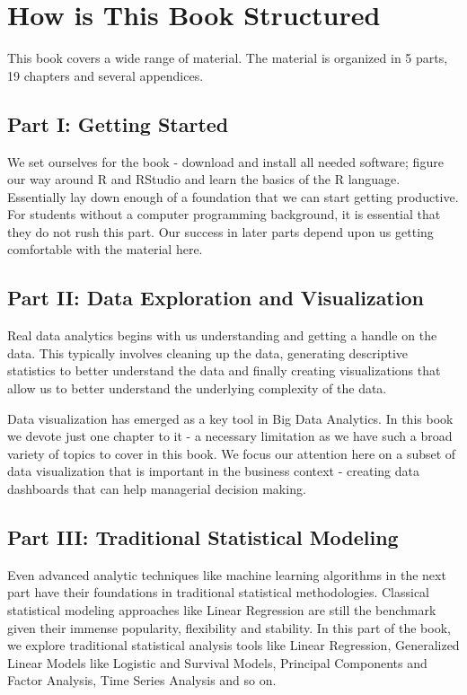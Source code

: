 \section*{How is This Book Structured}

This book covers a wide range of material. The material is organized in 5 parts, 19 chapters and several appendices.

\subsection{Part I: Getting Started}

We set ourselves for the book - download and install all needed software; figure our way around R and RStudio and learn the basics of the R language. Essentially lay down enough of a foundation that we can start getting productive. For students without a computer programming background, it is essential that they do not rush this part. Our success in later parts depend upon us getting comfortable with the material here.

\subsection{Part II: Data Exploration and Visualization}

Real data analytics begins with us understanding and getting a handle on the data. This typically involves cleaning up the data, generating descriptive statistics to better understand the data and finally creating visualizations that allow us to better understand the underlying complexity of the data.

Data visualization has emerged as a key tool in Big Data Analytics. In this book we devote just one chapter to it - a necessary limitation as we have such a broad variety of topics to cover in this book. We focus our attention here on a subset of data visualization that is important in the business context - creating data dashboards that can help managerial decision making.   

\subsection{Part III: Traditional Statistical Modeling}

Even advanced analytic techniques like machine learning algorithms in the next part have their foundations in traditional statistical methodologies. Classical statistical modeling approaches like Linear Regression are still the benchmark given their immense popularity, flexibility and stability. In this part of the book, we explore traditional statistical analysis tools like Linear Regression, Generalized Linear Models like Logistic and Survival Models, Principal Components and Factor Analysis, Time Series Analysis and so on.

